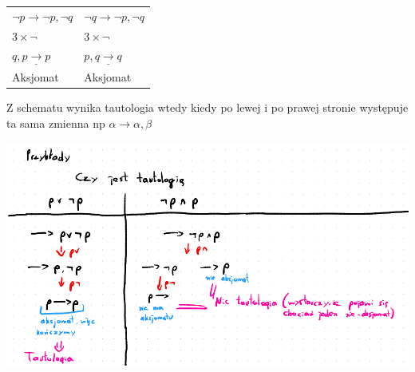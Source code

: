 \renewcommand{\arraystretch}{1.4}

\begin{center}
\begin{tabularx}{\textwidth}{X>{\centering\arraybackslash} X}
    \centering
    $ \neg p \rightarrow \neg p, \neg q $ & $ \neg q \rightarrow \neg p, \neg q $ \\
    \centering
    $ 3 \times \neg $ & $ 3 \times \neg $ \\
    \centering
    $ q, \underline{p \rightarrow p} $ & $ p, \underline{q \rightarrow q} $ \\
    \centering
    Aksjomat & Aksjomat \\
\end{tabularx}
\end{center}

Z schematu wynika tautologia wtedy kiedy po lewej i po prawej stronie występuje ta sama zmienna np $ \alpha \rightarrow \alpha, \beta $

\begin{center}
\includegraphics[scale=0.7]{img/gentzen.png}
\end{center}